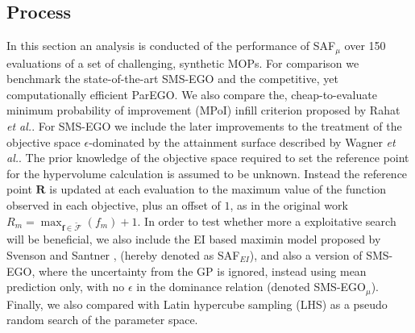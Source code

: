\documentclass[conference]{IEEEtran}
\makeatletter
\newcommand{\attainmentfront}{\mathcal{A}}
\newcommand{\rp}{\mathbf{R}}
\newcommand\safmu{SAF$_{\mu}$\xspace}
\newcommand\safei{SAF$_{EI}$\xspace}
\newcommand\smsego{SMS-EGO\xspace}
\newcommand\smsegomu{SMS-EGO$_{\mu}$\xspace}
\newcommand\parego{ParEGO\xspace}
\newcommand\mpoi{MPoI\xspace}
\newcommand\ei{EI\xspace}
\newcommand\gp{GP\xspace}
\newcommand\maximin{maximin\xspace}
\newcommand\Fapprox{\tilde{\mathcal{F}}}
\newcommand{\bff}{\mathbf{f}}
\newcommand{\fnote}[2][\textcolor{teal}{\dagger}]{$#1$\marginpar{\color{teal}\raggedright\tiny$#1$
    #2}}
\newcommand*{\etal}{\textit{et al.}\@\xspace}
\makeatother
\begin{document}
\subsection{Process}
In this section an analysis is conducted of the performance of \safmu over 150 evaluations of a set of challenging, synthetic MOPs. For comparison we benchmark the state-of-the-art \smsego \cite{ponweiser2008multiobjective} and the competitive, yet computationally efficient \parego \cite{knowles2006parego}. We also compare the, cheap-to-evaluate minimum probability of improvement (\mpoi) infill criterion proposed by Rahat \etal \cite{rahat2017alternative}. For \smsego we include the later improvements to the treatment of the objective space $\epsilon$-dominated by the attainment surface described by Wagner \etal \cite{wagner2010expected}.  The prior knowledge of the objective space required to set the reference point for the hypervolume calculation is assumed to be unknown. Instead the reference point $\rp$ is updated at each evaluation to the maximum value of the function observed in each objective, plus an offset of $1$, as in the original work $R_m = \max_{\bff \in \Fapprox}(f_m) +1$. %
In order to test whether more a exploitative search will be beneficial, we also include the \ei based \maximin model proposed by Svenson and Santner  \cite{svenson2016multiobjective}, (hereby denoted as \safei), and also a version of \smsego, where the uncertainty from the \gp is ignored, instead using mean prediction only, with no $\epsilon$ in the dominance relation (denoted \smsegomu). Finally, we also compared with Latin hypercube sampling (LHS) as a pseudo random search of the parameter space.
\end{document}
